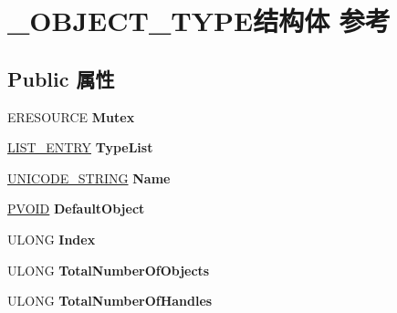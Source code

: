 \hypertarget{struct___o_b_j_e_c_t___t_y_p_e}{}\section{\+\_\+\+O\+B\+J\+E\+C\+T\+\_\+\+T\+Y\+P\+E结构体 参考}
\label{struct___o_b_j_e_c_t___t_y_p_e}
\subsection*{Public 属性}
\begin{DoxyCompactItemize}
\item 
\mbox{\label{struct___o_b_j_e_c_t___t_y_p_e_a8b2adf68504fb7e2bbad2865bbf82400}} 
E\+R\+E\+S\+O\+U\+R\+CE {\bfseries Mutex}
\item 
\mbox{\label{struct___o_b_j_e_c_t___t_y_p_e_a27628910ab7ddbc4e50cfd0aa706e949}} 
\hyperlink{struct___l_i_s_t___e_n_t_r_y}{L\+I\+S\+T\+\_\+\+E\+N\+T\+RY} {\bfseries Type\+List}
\item 
\mbox{\label{struct___o_b_j_e_c_t___t_y_p_e_ad2f43986e4c7e9f5d1b4d539ee05bc5d}} 
\hyperlink{struct___u_n_i_c_o_d_e___s_t_r_i_n_g}{U\+N\+I\+C\+O\+D\+E\+\_\+\+S\+T\+R\+I\+NG} {\bfseries Name}
\item 
\mbox{\label{struct___o_b_j_e_c_t___t_y_p_e_ae590d3359db5270e131fb19dab6ff290}} 
\hyperlink{interfacevoid}{P\+V\+O\+ID} {\bfseries Default\+Object}
\item 
\mbox{\label{struct___o_b_j_e_c_t___t_y_p_e_a189f50106949339ab424f05f34ace844}} 
U\+L\+O\+NG {\bfseries Index}
\item 
\mbox{\label{struct___o_b_j_e_c_t___t_y_p_e_a56d6d19e5b2d96352f31df6cd1739ac7}} 
U\+L\+O\+NG {\bfseries Total\+Number\+Of\+Objects}
\item 
\mbox{\label{struct___o_b_j_e_c_t___t_y_p_e_a04e4735e20a4e656c8e20e71f66ffc75}} 
U\+L\+O\+NG {\bfseries Total\+Number\+Of\+Handles}
\item 
\mbox{\label{struct___o_b_j_e_c_t___t_y_p_e_a286f312a7d9419eb2ff73028a13d2b5a}} 

\end{DoxyCompactItemize}
